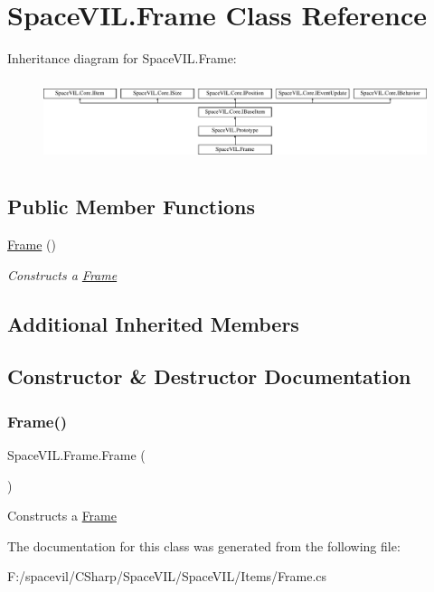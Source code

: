\hypertarget{class_space_v_i_l_1_1_frame}{}\section{Space\+V\+I\+L.\+Frame Class Reference}
\label{class_space_v_i_l_1_1_frame}
Inheritance diagram for Space\+V\+I\+L.\+Frame\+:\begin{figure}[H]
\begin{center}
\leavevmode
\includegraphics[height=2.421622cm]{class_space_v_i_l_1_1_frame}
\end{center}
\end{figure}
\subsection*{Public Member Functions}
\begin{DoxyCompactItemize}
\item 
\mbox{\hyperlink{class_space_v_i_l_1_1_frame_a637421f7d67b16e11064a78867a386db}{Frame}} ()
\begin{DoxyCompactList}\small\item\em Constructs a \mbox{\hyperlink{class_space_v_i_l_1_1_frame}{Frame}} \end{DoxyCompactList}\end{DoxyCompactItemize}
\subsection*{Additional Inherited Members}


\subsection{Constructor \& Destructor Documentation}
\mbox{\label{class_space_v_i_l_1_1_frame_a637421f7d67b16e11064a78867a386db}} 
\subsubsection{\texorpdfstring{Frame()}{Frame()}}
{\footnotesize\ttfamily Space\+V\+I\+L.\+Frame.\+Frame (\begin{DoxyParamCaption}{ }\end{DoxyParamCaption})\hspace{0.3cm}{\ttfamily [inline]}}



Constructs a \mbox{\hyperlink{class_space_v_i_l_1_1_frame}{Frame}} 



The documentation for this class was generated from the following file\+:\begin{DoxyCompactItemize}
\item 
F\+:/spacevil/\+C\+Sharp/\+Space\+V\+I\+L/\+Space\+V\+I\+L/\+Items/Frame.\+cs\end{DoxyCompactItemize}
